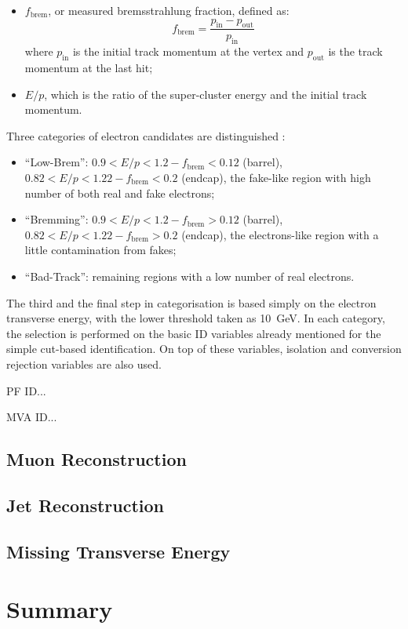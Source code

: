 \begin{itemize}
  \item $f_\text{brem}$, or measured bremsstrahlung fraction, defined as:
  \begin{equation}
    f_\text{brem} = \frac{p_\text{in}-p_\text{out}}{p_\text{in}}
  \end{equation}
  where $p_\text{in}$ is the initial track momentum at the vertex and $p_\text{out}$ is the track momentum at the last
  hit;
  \item $E/p$, which is the ratio of the super-cluster energy and the initial track momentum.
\end{itemize}

Three categories of electron candidates are distinguished \cite{CiC_ID}:
\begin{itemize}
  \item ``Low-Brem'': $0.9 < E/p < 1.2 - f_\text{brem} < 0.12$ (barrel), $0.82 < E/p < 1.22 - f_\text{brem} < 0.2$
  (endcap), the fake-like region with high number of both real and fake electrons;
  \item ``Bremming'': $0.9 < E/p < 1.2 - f_\text{brem} > 0.12$ (barrel), $0.82 < E/p < 1.22 - f_\text{brem} > 0.2$
  (endcap), the electrons-like region with a little contamination from fakes;
  \item ``Bad-Track'': remaining regions with a low number of real electrons.
\end{itemize}

The third and the final step in categorisation is based simply on the electron transverse energy, with the lower
threshold taken as \SI{10}{\GeV}. In each category, the selection is performed on the basic ID variables already
mentioned for the simple cut-based identification. On top of these variables, isolation and conversion rejection
variables are also used.


PF ID...

MVA ID...


\subsection{Muon Reconstruction}
\label{ss:muon_reconstruction}

\subsection{Jet Reconstruction}
\label{ss:jet_reconstruction}

\subsection{Missing Transverse Energy}
\label{ss:MET_reconstruction}

\section{Summary}


